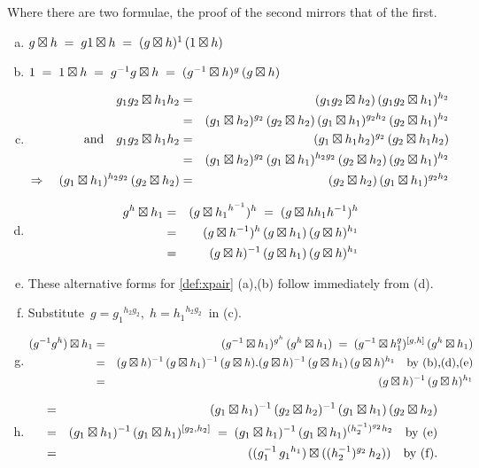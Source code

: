 \begin{pf}
Where there are two formulae, the proof of the second
mirrors that of the first.
\begin{enumerate}[(a)]
\item\quad
$g \boxtimes h \;=\; g1 \boxtimes h \;=\; (g \boxtimes h)^1\,(1 \boxtimes h) $
\item\quad
$1\;=\; 1 \boxtimes h \;=\; g^{-1}g \boxtimes h \;=\; (g^{-1} \boxtimes h)^g \,(g \boxtimes h)$
\item\quad\vspace{-7mm}
\begin{eqnarray*}
g_1g_2 \boxtimes h_1h_2
  & = &  (g_1g_2 \boxtimes h_2)\,(g_1g_2 \boxtimes h_1)^{h_2} \\
  & = &  (g_1 \boxtimes h_2)^{g_2}\,(g_2 \boxtimes h_2)\,
          (g_1 \boxtimes h_1)^{g_2h_2}\,(g_2 \boxtimes h_1)^{h_2} \\
\mbox{and} \quad
g_1g_2 \boxtimes h_1h_2
  & = &  (g_1 \boxtimes h_1h_2)^{g_2}\,(g_2 \boxtimes h_1h_2) \\
  & = &  (g_1 \boxtimes h_2)^{g_2}\,(g_1 \boxtimes h_1)^{h_2g_2}\,
          (g_2 \boxtimes h_2)\,(g_2 \boxtimes h_1)^{h_2} \\
\Rightarrow \quad
   (g_1 \boxtimes h_1)^{h_2g_2}\,(g_2 \boxtimes h_2) 
  & = &  (g_2 \boxtimes h_2)\,(g_1 \boxtimes h_1)^{g_2h_2}
\end{eqnarray*}
\item\quad\vspace{-7mm}
\begin{eqnarray*}
g^h \boxtimes h_1
  & = &  (g \boxtimes {h_1}^{h^{-1}})^h  \;=\;  (g \boxtimes hh_1h^{-1})^h \\
  & = &  (g \boxtimes h^{-1})^h\,(g \boxtimes h_1)\,(g \boxtimes h)^{h_1} \\
  & = &  (g \boxtimes h)^{-1}\,(g \boxtimes h_1)\,(g \boxtimes h)^{h_1} 
\end{eqnarray*}
\item\quad
These alternative forms for \ref{def:xpair} (a),(b)
follow immediately from (d).
\item\quad
Substitute  $\,g = {g_1}^{h_2g_2},\; h = {h_1}^{h_2g_2}\,$  in (c).
\item\quad\vspace{-7mm}
\begin{eqnarray*}
(g^{-1}g^h) \boxtimes h_1
  & = &  (g^{-1} \boxtimes h_1)^{g^h}\,(g^h \boxtimes h_1)
  \;=\;  (g^{-1} \boxtimes h_1^g)^{[g,h]}\,(g^h \boxtimes h_1) \\
  & = &  (g \boxtimes h)^{-1}\,(g \boxtimes h_1)^{-1}\,(g \boxtimes h)
          .(g \boxtimes h)^{-1}\,(g \boxtimes h_1)\,(g \boxtimes h)^{h_1}
           \quad \mbox{by (b),(d),(e)} \\
  & = &  (g \boxtimes h)^{-1}\,(g \boxtimes h)^{h_1}
\end{eqnarray*}
\item\quad\vspace{-7mm}
\begin{eqnarray*}
[\gbho,\gbht]
  & = &  (\gbho)^{-1}\,(\gbht)^{-1}\,(\gbho)\,(\gbht) \\
  & = &  (\gbho)^{-1}\,(\gbho)^{[g_2,h_2]}
  \;=\;  (\gbho)^{-1}\,(\gbho)^{(h_2^{-1})^{g_2}h_2}
         \quad \mbox{by (e)} \\
  & = &  ((g_1^{-1}\,{g_1}^{h_1}) \bt ((h_2^{-1})^{g_2}\,h_2)) 
         \quad \mbox{by (f)}.
\end{eqnarray*}
\end{enumerate}
\end{pf}

